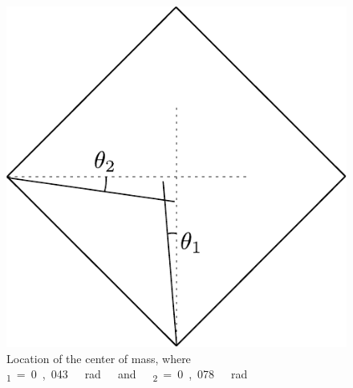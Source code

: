 \begin{figure}[H]
	\centering
	\includegraphics[scale=0.5]{figures/centerOfMassDiagram}
	\caption{Location of the center of mass, where \si{\theta_1=0,043\ rad\ and\ \theta_2=0,078\ rad}}
	\label{centerOfMassDiagram2}
\end{figure}